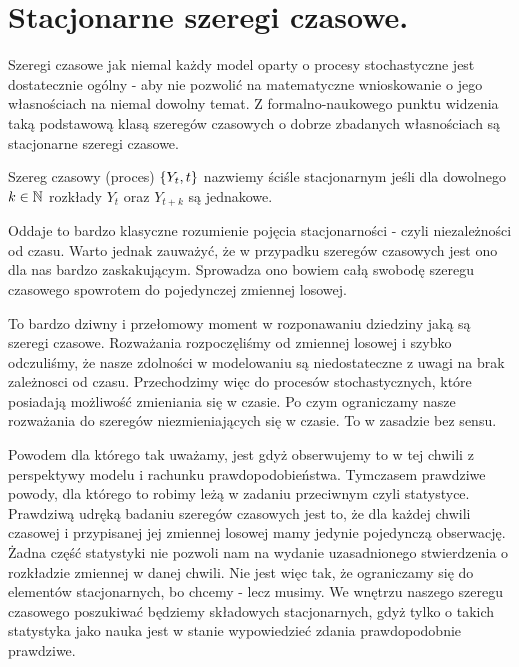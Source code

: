 \documentclass[10pt,a4paper]{book}
\begin{document}
\section{Stacjonarne szeregi czasowe.}

Szeregi czasowe jak niemal każdy model oparty o procesy stochastyczne jest dostatecznie ogólny - aby nie pozwolić na matematyczne wnioskowanie o jego własnościach na niemal dowolny temat. Z formalno-naukowego punktu widzenia taką podstawową klasą szeregów czasowych o dobrze zbadanych własnościach są stacjonarne szeregi czasowe.  

\begin{definition}
Szereg czasowy (proces) $\left\lbrace {{Y_t}, {t}} \right\rbrace$ nazwiemy ściśle stacjonarnym jeśli dla dowolnego $k \in \mathbb{N}$ rozkłady $Y_t$ oraz $Y_{t+k}$ są jednakowe.
\end{definition}

Oddaje to bardzo klasyczne rozumienie pojęcia stacjonarności - czyli niezależności od czasu. Warto jednak zauważyć, że w przypadku szeregów czasowych jest ono dla nas bardzo zaskakującym. Sprowadza ono bowiem całą swobodę szeregu czasowego spowrotem do pojedynczej zmiennej losowej. 

\begin{remark*}
To bardzo dziwny i przełomowy moment w rozponawaniu dziedziny jaką są szeregi czasowe. Rozważania rozpoczęliśmy od zmiennej losowej i szybko odczuliśmy, że nasze zdolności w modelowaniu są niedostateczne z uwagi na brak zależnosci od czasu. Przechodzimy więc do procesów stochastycznych, które posiadają możliwość zmieniania się w czasie. Po czym ograniczamy nasze rozważania do szeregów niezmieniających się w czasie. To w zasadzie bez sensu. 

Powodem dla którego tak uważamy, jest gdyż obserwujemy to w tej chwili z perspektywy modelu i rachunku prawdopodobieństwa. Tymczasem prawdziwe powody, dla którego to robimy leżą w zadaniu przeciwnym czyli statystyce. Prawdziwą udręką badaniu szeregów czasowych jest to, że dla każdej chwili czasowej i przypisanej jej zmiennej losowej mamy jedynie pojedynczą obserwację. Żadna część statystyki nie pozwoli nam na wydanie uzasadnionego stwierdzenia o rozkładzie zmiennej w danej chwili. Nie jest więc tak, że ograniczamy się do elementów stacjonarnych, bo chcemy - lecz musimy. We wnętrzu naszego szeregu czasowego poszukiwać będziemy składowych stacjonarnych, gdyż tylko o takich statystyka jako nauka jest w stanie wypowiedzieć zdania prawdopodobnie prawdziwe.
\end{remark*}
\end{document}
